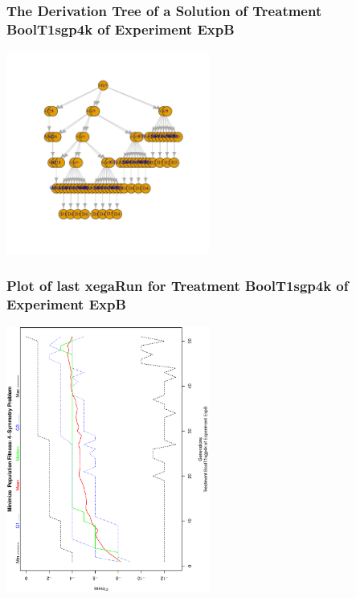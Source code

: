 \documentclass[18pt,c]{beamer}
\begin{document}
 \begin{frame}
 \frametitle{ The Derivation Tree of a Solution of Treatment BoolT1sgp4k of Experiment ExpB }
 \begin{center}
\includegraphics[width=0.5\textwidth, angle=0]
{ExpBDerivationTreeFigure007.pdf}
 \end{center}
 \label{report/ExpBDerivationTreeFigure007.pdf}  
 \end{frame}

 \begin{frame}
 \frametitle{ Plot of last xegaRun for Treatment BoolT1sgp4k of Experiment ExpB }
 \begin{center}
\includegraphics[width=0.5\textwidth, angle=-90]
{ExpBPlotPopStatsFigure007.eps}
 \end{center}
 \label{report/ExpBPlotPopStatsFigure007.eps}  
 \end{frame}
\end{document}

